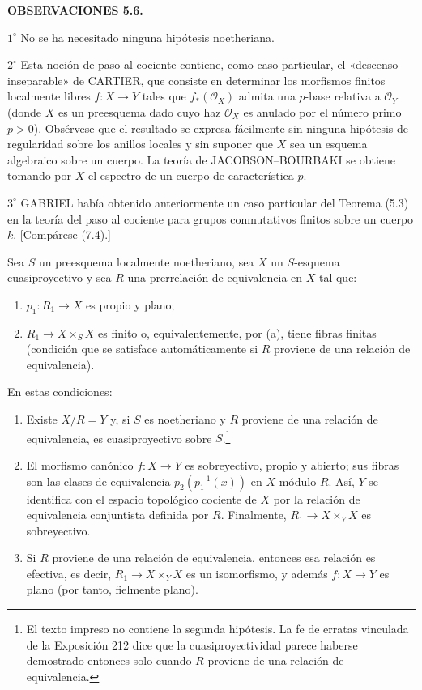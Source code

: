 \medskip
\noindent\textbf{OBSERVACIONES 5.6.}

\smallskip
\noindent $1^\circ$ No se ha necesitado ninguna hipótesis noetheriana.

\smallskip
\noindent $2^\circ$ Esta noción de paso al cociente contiene, como caso
particular, el «descenso inseparable» de CARTIER, que consiste en determinar
los morfismos finitos localmente libres $f:X\to Y$ tales que
$f_*(\mathcal O_X)$ admita una $p$-base relativa a $\mathcal O_Y$ (donde $X$
es un preesquema dado cuyo haz $\mathcal O_X$ es anulado por el número primo
$p>0$). Obsérvese que el resultado se expresa fácilmente sin ninguna
hipótesis de regularidad sobre los anillos locales y sin suponer que $X$ sea
un esquema algebraico sobre un cuerpo. La teoría de JACOBSON--BOURBAKI se
obtiene tomando por $X$ el espectro de un cuerpo de característica $p$.

\smallskip
\noindent $3^\circ$ GABRIEL había obtenido anteriormente un caso particular
del Teorema (5.3) en la teoría del paso al cociente para grupos conmutativos
finitos sobre un cuerpo $k$. [Compárese (7.4).]


 Sea $S$ un preesquema localmente noetheriano, sea $X$
un $S$-esquema cuasiproyectivo y sea $R$ una prerrelación de equivalencia en
$X$ tal que:
\begin{enumerate}
\item[(a)] $p_1:R_1\to X$ es propio y plano;
\item[(b)] $R_1\to X\times_S X$ es finito o, equivalentemente, por (a), tiene
fibras finitas (condición que se satisface automáticamente si $R$ proviene de
una relación de equivalencia).
\end{enumerate}
En estas condiciones:
\begin{enumerate}
\item[(i)] Existe $X/R=Y$ y, si $S$ es noetheriano y $R$ proviene de una
relación de equivalencia, es cuasiproyectivo sobre $S$.\footnote{El texto
impreso no contiene la segunda hipótesis. La fe de erratas vinculada de la Exposición
212 dice que la cuasiproyectividad parece haberse demostrado entonces solo
cuando $R$ proviene de una relación de equivalencia.}

\item[(ii)] El morfismo canónico $f:X\to Y$ es sobreyectivo, propio y abierto;
sus fibras son las clases de equivalencia $p_2(p_1^{-1}(x))$ en $X$ módulo
$R$. Así, $Y$ se identifica con el espacio topológico cociente de $X$ por la
relación de equivalencia conjuntista definida por $R$. Finalmente,
$R_1\to X\times_Y X$ es sobreyectivo.

\item[(iii)] Si $R$ proviene de una relación de equivalencia, entonces esa
relación es efectiva, es decir, $R_1\to X\times_Y X$ es un isomorfismo, y
además $f:X\to Y$ es plano (por tanto, fielmente plano).
\end{enumerate}

